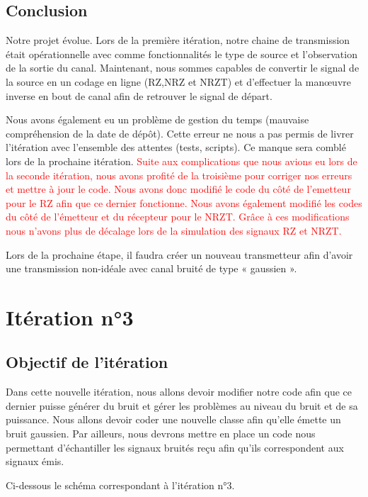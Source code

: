 \subsection{Conclusion}

Notre projet évolue. Lors de la première itération, notre chaine de transmission était opérationnelle avec comme fonctionnalités le type de source et l’observation de la sortie du canal.
Maintenant, nous sommes capables de convertir le signal de la source en un codage en ligne (RZ,NRZ et NRZT) et d’effectuer la manœuvre inverse en bout de canal afin de retrouver le signal de départ.

Nous avons également eu un problème de gestion du temps (mauvaise compréhension de la date de dépôt). Cette erreur ne nous a pas permis de livrer l’itération avec l’ensemble des attentes (tests, scripts). Ce manque sera comblé lors de la prochaine itération.
\textcolor{red}{Suite aux complications que nous avions eu lors de la seconde itération, nous avons profité de la troisième pour corriger nos erreurs et mettre à jour le code. Nous avons donc modifié le code du côté de l'emetteur pour le RZ afin que ce dernier fonctionne. Nous avons également modifié les codes du côté de l'émetteur et du récepteur pour le NRZT. Grâce à ces modifications nous n'avons plus de décalage lors de la simulation des signaux RZ et NRZT.}

Lors de la prochaine étape, il faudra créer un nouveau transmetteur afin d’avoir une transmission non-idéale avec canal bruité de type « gaussien ».


\newpage

\section{Itération n°3}

\subsection{Objectif de l'itération}

Dans cette nouvelle itération, nous allons devoir modifier notre code afin que ce dernier puisse générer du bruit et gérer les problèmes au niveau du bruit et de sa puissance. Nous allons devoir coder une nouvelle classe afin qu'elle émette un bruit gaussien. Par ailleurs, nous devrons mettre en place un code nous permettant d'échantiller les signaux bruités reçu afin qu'ils correspondent aux signaux émis.

Ci-dessous le schéma correspondant à l'itération n°3.

